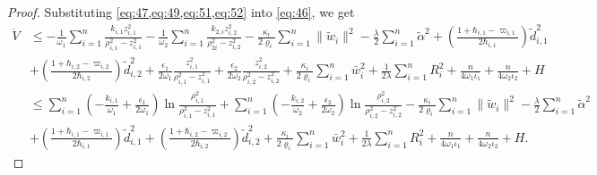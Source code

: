 \documentclass[pdflatex,sn-mathphys-num]{sn-jnl}%
\theoremstyle{thmstyleone}%
\theoremstyle{thmstyletwo}%
\theoremstyle{thmstylethree}%
\begin{document}
\begin{proof}
Substituting \cref{eq:47,eq:49,eq:51,eq:52} into \cref{eq:46}, we get
\begin{equation}\label{eq:53}
	\begin{aligned}
		\dot{V} &\le  - \frac{1}{\omega_{1}}\sum_{i=1}^{n}\frac{k_{i,1} z_{i,1}^2}{\rho_{i,1}^2 - z_{i,1}^2}- \frac{1}{\omega_{2}}\sum_{i=1}^{n}\frac{ k_{2,i} z_{i,2}^2}{\rho_{2i}^2 - z_{i,2}^2} - \frac{\kappa_i}{2\varrho_i}\sum_{i=1}^n \|\tilde w_i\|^2-\frac{\lambda}{2} \sum_{i=1}^{n} {\tilde{\alpha}}^{2}+\left(\frac{1+\hbar_{i,1}-\varpi_{i,1}}{2\hbar_{i,1}}\right)\tilde{d}_{i,1}^2 \\
		&+\left(\frac{1+\hbar_{i,2}-\varpi_{i,2}}{2\hbar_{i,2}}\right)\tilde{d}_{i,2}^2 +\frac{\epsilon_1}{2 \omega_1} \frac{z_{i,1}^2}{\rho_{i,1}^2 - z_{i,1}^2}+\frac{\epsilon_2}{2 \omega_2} \frac{z_{i,2}^2}{\rho_{i,2}^2 - z_{i,2}^2}
		+\frac{\kappa_i}{2\varrho_i}\sum_{i=1}^n \bar w_i^2 +\frac{1}{2\lambda} \sum_{i=1}^{n}R_{i}^2 + \frac{n}{4  \omega_{1} \iota_1 }+ \frac{n}{4  \omega_{2}\iota_2 }+H \\
		 & \le\sum_{i=1}^{n} \left( - \frac{k_{i,1}}{\omega_{1}}+\frac{\epsilon_1}{2 \omega_1}\right)\ln\frac{\rho_{i,1}^2}{\rho_{i,1}^2-z_{i,1}^2}+\sum_{i=1}^{n} \left( - \frac{k_{i,2}}{\omega_{2}}+\frac{\epsilon_2}{2 \omega_2}\right)\ln\frac{\rho_{i,2}^2}{\rho_{i,2}^2-z_{i,2}^2}- \frac{\kappa_i}{2\varrho_i}\sum_{i=1}^n \|\tilde w_i\|^2-\frac{\lambda}{2} \sum_{i=1}^{n} {\tilde{\alpha}}^{2} \\
		 &+\left(\frac{1+\hbar_{i,1}-\varpi_{i,1}}{2\hbar_{i,1}}\right)\tilde{d}_{i,1}^2 +\left(\frac{1+\hbar_{i,2}-\varpi_{i,2}}{2\hbar_{i,2}}\right)\tilde{d}_{i,2}^2
		 +\frac{\kappa_i}{2\varrho_i}\sum_{i=1}^n \bar w_i^2 +\frac{1}{2\lambda} \sum_{i=1}^{n}R_{i}^2 + \frac{n}{4  \omega_{1} \iota_1 }+ \frac{n}{4  \omega_{2}\iota_2 }+H .  
	\end{aligned}
\end{equation}



\end{proof}
\end{document}

